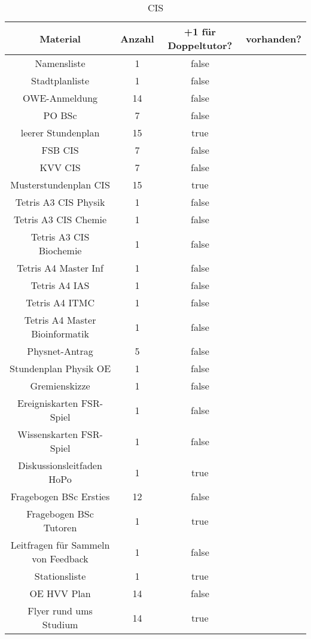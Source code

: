 \documentclass[10pt,a4paper,oneside,ngerman,numbers=noenddot]{scrartcl}
\begin{document}
\begin{table}[ht]
	\caption{CIS}
	\begin{tabular}{c|c|c|c}
		\textbf{Material} & \textbf{Anzahl} & \textbf{+1 für Doppeltutor?} & \textbf{vorhanden?} \\
		\hline
		Namensliste & 1 & false & \\
		\hline
		Stadtplanliste & 1 & false & \\
		\hline
		OWE-Anmeldung & 14 & false & \\
		\hline
		PO BSc & 7 & false & \\
		\hline
		leerer Stundenplan & 15 & true & \\
		\hline
		FSB CIS & 7 & false & \\
		\hline
		KVV CIS & 7 & false & \\
		\hline
		Musterstundenplan CIS & 15 & true & \\
		\hline
		Tetris A3 CIS Physik & 1 & false & \\
		\hline
		Tetris A3 CIS Chemie & 1 & false & \\
		\hline
		Tetris A3 CIS Biochemie & 1 & false & \\
		\hline
		Tetris A4 Master Inf & 1 & false & \\
		\hline
		Tetris A4 IAS & 1 & false & \\
		\hline
		Tetris A4 ITMC & 1 & false & \\
		\hline
		Tetris A4 Master Bioinformatik & 1 & false & \\
		\hline
		Physnet-Antrag & 5 & false & \\
		\hline
		Stundenplan Physik OE & 1 & false & \\
		\hline
		Gremienskizze & 1 & false & \\
		\hline
		Ereigniskarten FSR-Spiel & 1 & false & \\
		\hline
		Wissenskarten FSR-Spiel & 1 & false & \\
		\hline
		Diskussionsleitfaden HoPo & 1 & true & \\
		\hline
		Fragebogen BSc Ersties & 12 & false & \\
		\hline
		Fragebogen BSc Tutoren & 1 & true & \\
		\hline
		Leitfragen für Sammeln von Feedback & 1 & false & \\
		\hline
		Stationsliste & 1 & true & \\
		\hline
		OE HVV Plan & 14 & false & \\
		\hline
		Flyer rund ums Studium & 14 & true & \\

\end{tabular}
\end{table}
\end{document}
